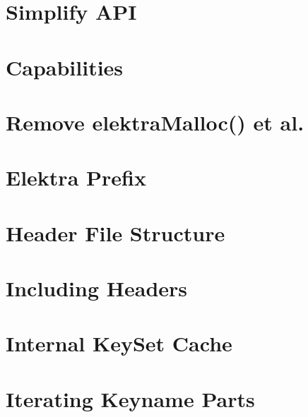 \let\mypdfximage\pdfximage\def\pdfximage{\immediate\mypdfximage}\documentclass[twoside]{book}
\newcommand{\+}{\discretionary{\mbox{\scriptsize$\hookleftarrow$}}{}{}}
\begin{document}
\chapter{Simplify API}
\label{doc_decisions_2_solutions_clear_simplify_api_md}

\chapter{Capabilities}
\label{doc_decisions_4_decided_capabilities_md}

\chapter{Remove elektra\+Malloc() et al.}
\label{doc_decisions_4_decided_elektra_malloc_md}

\chapter{Elektra Prefix}
\label{doc_decisions_4_decided_elektra_prefix_md}

\chapter{Header File Structure}
\label{doc_decisions_4_decided_header_file_structure_md}

\chapter{Including Headers}
\label{doc_decisions_4_decided_header_include_md}

\chapter{Internal Key\+Set Cache}
\label{doc_decisions_4_decided_internal_cache_md}

\chapter{Iterating Keyname Parts}
\label{doc_decisions_4_decided_iterating_name_parts_md}

\end{document}
